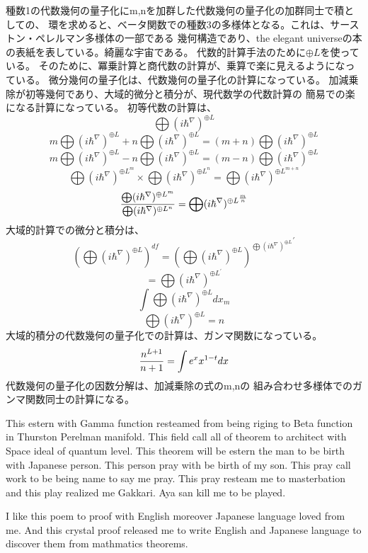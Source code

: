 \documentclass{jsarticle}
\begin{document}
    種数1の代数幾何の量子化にm,nを加群した代数幾何の量子化の加群同士で積としての、
    環を求めると、ベータ関数での種数3の多様体となる。これは、サーストン・ペレルマン多様体の一部である
    幾何構造であり、the elegant universeの本の表紙を表している。綺麗な宇宙である。
         代数的計算手法のために$ \oplus L $を使っている。
そのために、冪乗計算と商代数の計算が、乗算で楽に見えるようになっている。
            微分幾何の量子化は、代数幾何の量子化の計算になっている。
  加減乗除が初等幾何であり、大域的微分と積分が、現代数学の代数計算の
  簡易での楽になる計算になっている。
  初等代数の計算は、
  $$ \bigoplus({i \hbar^{\nabla}})^{\oplus L} $$
   $$m \bigoplus({i \hbar^{\nabla}})^{\oplus L} +  
   n\bigoplus({i \hbar^{\nabla}})^{\oplus L} = 
   (m+n) \bigoplus({i \hbar^{\nabla}})^{\oplus L}   $$
   $$ m\bigoplus({i \hbar^{\nabla}})^{\oplus L} -  
   n\bigoplus({i \hbar^{\nabla}})^{\oplus L} = 
   (m-n) \bigoplus({i \hbar^{\nabla}})^{\oplus L}   $$
   $$ \bigoplus({i \hbar^{\nabla}})^{{\oplus L}^m} \times 
      \bigoplus({i \hbar^{\nabla}})^{{\oplus L}^n} =
   \bigoplus({i \hbar^{\nabla}})^{\oplus L^{m+n}} $$
  $$ {{\bigoplus({i \hbar^{\nabla}})^{\oplus L^m}}  \over  
  {\bigoplus({i \hbar^{\nabla}})^{\oplus L^n}}} =  
  \bigoplus({i \hbar^{\nabla}})^{\oplus L^{m\over n}} $$
  大域的計算での微分と積分は、
  $$ \left(\bigoplus({i \hbar^{\nabla}})^{\oplus L}\right)^{df}
  =  {\left(\bigoplus({i \hbar^{\nabla}})^{\oplus L}\right)^{
	  \bigoplus({i \hbar^{\nabla}})^{\oplus L}}}^{'}  $$
  $$ = \bigoplus({i \hbar^{\nabla}})^{\oplus L^{'}} $$
   $$ \int \bigoplus({i \hbar^{\nabla}})^{\oplus L} dx_m $$
   $$ \bigoplus({i \hbar^{\nabla}})^{\oplus L} = n $$
   大域的積分の代数幾何の量子化での計算は、ガンマ関数になっている。
   $$ {n^{L+1} \over {n+1}} = \int e^x x^{1 - t} dx $$
   代数幾何の量子化の因数分解は、加減乗除の式のm,nの
   組み合わせ多様体でのガンマ関数同士の計算になる。


       This estern with Gamma function resteamed from being riging to Beta function in Thurston
   Perelman manifold. This field call all of theorem to architect with Space ideal of quantum level.
     This theorem will be estern the man to be birth with Japanese person.
   This person pray with be birth of my son.
   This pray call work to be being name to say me pray.
   This pray resteam me to masterbation and this play realized me Gakkari.
   Aya san kill me to be played.

     I like this poem to proof with English moreover Japanese language loved from me.
     And this crystal proof released me to write English and Japanese language to discover them
     from mathmatics theorems.
\end{document}
